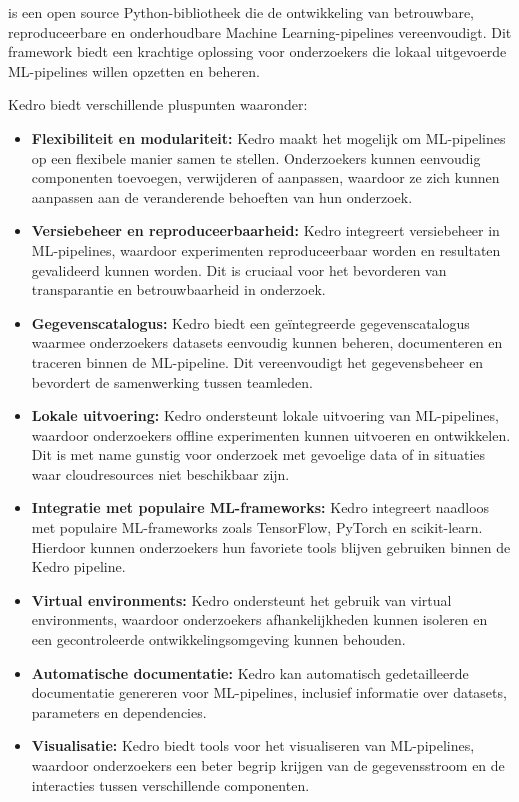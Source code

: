 \textcite{Kedro2024} is een open source Python-bibliotheek die de ontwikkeling van betrouwbare, reproduceerbare en onderhoudbare Machine Learning-pipelines vereenvoudigt. Dit framework biedt een krachtige oplossing voor onderzoekers die lokaal uitgevoerde ML-pipelines willen opzetten en beheren.

Kedro biedt verschillende pluspunten waaronder:

\begin{itemize}
    \item \textbf{Flexibiliteit en modulariteit:} Kedro maakt het mogelijk om ML-pipelines op een flexibele manier samen te stellen. Onderzoekers kunnen eenvoudig componenten toevoegen, verwijderen of aanpassen, waardoor ze zich kunnen aanpassen aan de veranderende behoeften van hun onderzoek.
    \item \textbf{Versiebeheer en reproduceerbaarheid:} Kedro integreert versiebeheer in ML-pipelines, waardoor experimenten reproduceerbaar worden en resultaten gevalideerd kunnen worden. Dit is cruciaal voor het bevorderen van transparantie en betrouwbaarheid in onderzoek.
    \item \textbf{Gegevenscatalogus:} Kedro biedt een geïntegreerde gegevenscatalogus waarmee onderzoekers datasets eenvoudig kunnen beheren, documenteren en traceren binnen de ML-pipeline. Dit vereenvoudigt het gegevensbeheer en bevordert de samenwerking tussen teamleden.
    \item \textbf{Lokale uitvoering:} Kedro ondersteunt lokale uitvoering van ML-pipelines, waardoor onderzoekers offline experimenten kunnen uitvoeren en ontwikkelen. Dit is met name gunstig voor onderzoek met gevoelige data of in situaties waar cloudresources niet beschikbaar zijn.
    \item \textbf{Integratie met populaire ML-frameworks:} Kedro integreert naadloos met populaire ML-frameworks zoals TensorFlow, PyTorch en scikit-learn. Hierdoor kunnen onderzoekers hun favoriete tools blijven gebruiken binnen de Kedro pipeline.
    \item \textbf{Virtual environments:} Kedro ondersteunt het gebruik van virtual environments, waardoor onderzoekers afhankelijkheden kunnen isoleren en een gecontroleerde ontwikkelingsomgeving kunnen behouden.
    \item \textbf{Automatische documentatie:} Kedro kan automatisch gedetailleerde documentatie genereren voor ML-pipelines, inclusief informatie over datasets, parameters en dependencies.
    \item \textbf{Visualisatie:} Kedro biedt tools voor het visualiseren van ML-pipelines, waardoor onderzoekers een beter begrip krijgen van de gegevensstroom en de interacties tussen verschillende componenten.
\end{itemize}


